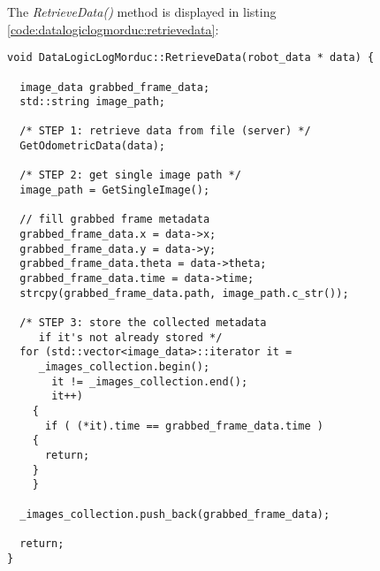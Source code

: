 The \textit{RetrieveData()} method is displayed in listing
\ref{code:datalogiclogmorduc:retrievedata}:
\\
\begin{lstlisting}[caption={\texttt{DataLogicLogMorduc::RetrieveData()} method},
    label={code:datalogiclogmorduc:retrievedata}]
void DataLogicLogMorduc::RetrieveData(robot_data * data) {

  image_data grabbed_frame_data;
  std::string image_path;

  /* STEP 1: retrieve data from file (server) */
  GetOdometricData(data);

  /* STEP 2: get single image path */
  image_path = GetSingleImage();
   
  // fill grabbed frame metadata
  grabbed_frame_data.x = data->x;
  grabbed_frame_data.y = data->y;
  grabbed_frame_data.theta = data->theta;
  grabbed_frame_data.time = data->time;
  strcpy(grabbed_frame_data.path, image_path.c_str());

  /* STEP 3: store the collected metadata
     if it's not already stored */
  for (std::vector<image_data>::iterator it =
	 _images_collection.begin();
       it != _images_collection.end();
       it++)
    {
      if ( (*it).time == grabbed_frame_data.time )
	{
	  return;
	}
    }

  _images_collection.push_back(grabbed_frame_data);
  
  return;
}
\end{lstlisting}

